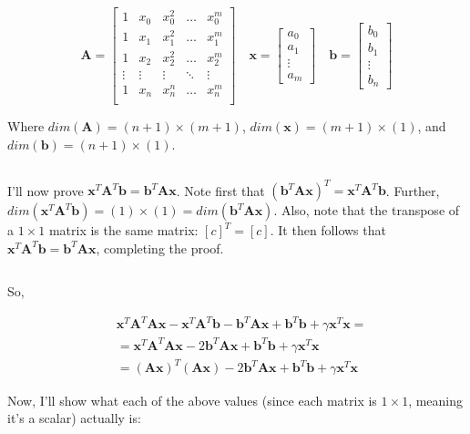 \documentclass{article}
\newcommand{\x}{\mathbf{x}}
\newcommand{\A}{\mathbf{A}}
\newcommand{\B}{\mathbf{b}} %
\begin{document}
\begin{equation*}
    \A =
    \begin{bmatrix}
        1 & x_0 & x_0 ^2 & \ldots & x_0^m \\
        1 & x_1 & x_1 ^2 & \ldots & x_1^m \\
        1 & x_2 & x_2 ^2 & \ldots & x_2^m \\
        \vdots & \vdots & \vdots & \ddots & \vdots \\
        1 & x_n & x_n ^n & \ldots & x_n^m \\
    \end{bmatrix}
    \quad
    \x =
    \begin{bmatrix}
        a_0\\
        a_1\\
        \vdots\\
        a_m
    \end{bmatrix}
    \quad
    \B =
    \begin{bmatrix}
        b_0\\
        b_1\\
        \vdots\\
        b_n
    \end{bmatrix}
\end{equation*}

Where $dim(\A)=(n+1)\times(m+1)$, $dim(\x)=(m+1)\times(1)$, and $dim(\B)=(n+1)\times(1)$.

$ $ %

I'll now prove $\x^T\A^T\B = \B^T\A\x$. Note first that $(\B^T\A\x)^T=\x^T\A^T\B$. Further, $dim(\x^T\A^T\B) = (1) \times (1) = dim(\B^T\A\x)$. Also, note that the transpose of a $1 \times 1$ matrix is the same matrix: $[c]^T=[c]$. It then follows that $\x^T\A^T\B = \B^T\A\x$, completing the proof.

$ $ %

So,

\begin{equation} \label{eqn:rls_prod}
\begin{split}
    &\x^T \A^T \A\x - \x^T \A^T \B - \B^T \A\x + \B^T \B + \gamma \x^T \x = \\ 
    & = \x^T \A^T \A\x -2 \B^T \A\x + \B^T \B + \gamma \x^T \x\\
    & = (\A\x)^T(\A\x) -2 \B^T \A\x + \B^T \B + \gamma \x^T \x
\end{split}
\end{equation}

Now, I'll show what each of the above values (since each matrix is $1 \times 1$, meaning it's a scalar) actually is:
\end{document}
